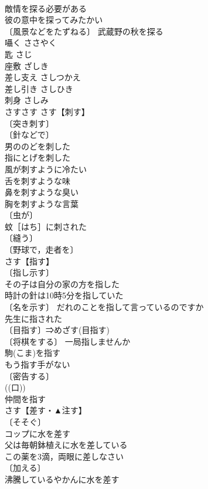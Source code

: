 \documentclass[8pt]{extreport}
\begin{document}
\begin{CJK}{UTF8}{min}
\\	敵情を探る必要がある 
\\	彼の意中を探ってみたかい 
\\	〔風景などをたずねる〕 武蔵野の秋を探る 
\\	囁く	ささやく	
\\	匙	さじ	
\\	座敷	ざしき	
\\	差し支え	さしつかえ	
\\	差し引き	さしひき	
\\	刺身	さしみ	
\\	さすさす		さす【刺す】 
\\	〔突き刺す〕
\\	〔針などで〕
\\	男ののどを刺した 
\\	指にとげを刺した 
\\	風が刺すように冷たい 
\\	舌を刺すような味 
\\	鼻を刺すような臭い 
\\	胸を刺すような言葉 
\\	〔虫が〕
\\	蚊［はち］に刺された 
\\	〔縫う〕
\\	〔野球で，走者を〕
\\	さす【指す】 
\\	〔指し示す〕
\\	その子は自分の家の方を指した 
\\	時計の針は10時5分を指していた 
\\	〔名を示す〕 だれのことを指して言っているのですか 
\\	先生に指された 
\\	〔目指す〕⇒めざす(目指す) 
\\	〔将棋をする〕 一局指しませんか 
\\	駒(こま)を指す 
\\	もう指す手がない 
\\	〔密告する〕
\\	((口)) 
\\	仲間を指す 
\\	さす【差す・▲注す】 
\\	〔そそぐ〕
\\	コップに水を差す 
\\	父は毎朝鉢植えに水を差している 
\\	この薬を3滴，両眼に差しなさい 
\\	〔加える〕
\\	沸騰しているやかんに水を差す 

\end{CJK}
\end{document}
